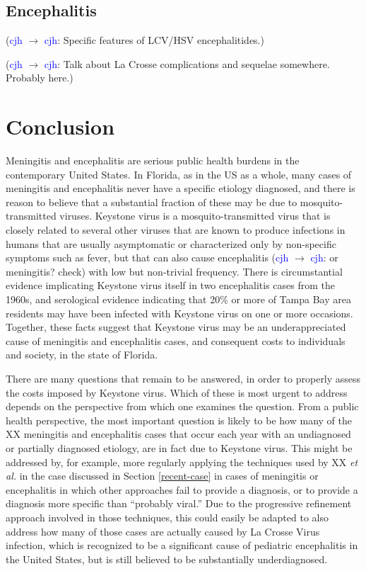 \documentclass[12pt]{article}
\newcommand{\cjh}{\textcolor{blue}{cjh}}
\newcommand{\msg}[3]{(#1 $\rightarrow$ #2: #3)}
\newcommand{\mcc}[1]{\msg\cjh\cjh{#1}}
\begin{document}
        \subsection{Encephalitis}
            \label{cost-encephalitis}
            \mcc{Specific features of LCV/HSV encephalitides.}

            \mcc{Talk about La Crosse complications and sequelae somewhere. Probably here.}

    \section{Conclusion}
        \label{conclusion}
        Meningitis and encephalitis are serious public health burdens in the contemporary United States. In Florida, as in the US as a whole, many cases of meningitis and encephalitis never have a specific etiology diagnosed, and there is reason to believe that a substantial fraction of these may be due to mosquito-transmitted viruses. Keystone virus is a mosquito-transmitted virus that is closely related to several other viruses that are known to produce infections in humans that are usually asymptomatic or characterized only by non-specific symptoms such as fever, but that can also cause encephalitis \mcc{or meningitis? check} with low but non-trivial frequency. There is circumstantial evidence implicating Keystone virus itself in two encephalitis cases from the 1960s, and serological evidence indicating that 20\% or more of Tampa Bay area residents may have been infected with Keystone virus on one or more occasions. Together, these facts suggest that Keystone virus may be an underappreciated cause of meningitis and encephalitis cases, and consequent costs to individuals and society, in the state of Florida.

        There are many questions that remain to be answered, in order to properly assess the costs imposed by Keystone virus. Which of these is most urgent to address depends on the perspective from which one examines the question. From a public health perspective, the most important question is likely to be how many of the XX meningitis and encephalitis cases that occur each year with an undiagnosed or partially diagnosed etiology, are in fact due to Keystone virus. This might be addressed by, for example, more regularly applying the techniques used by XX \textit{et al.}\cite{asdf} in the case discussed in Section \ref{recent-case} in cases of meningitis or encephalitis in which other approaches fail to provide a diagnosis, or to provide a diagnosis more specific than ``probably viral.'' Due to the progressive refinement approach involved in those techniques, this could easily be adapted to also address how many of those cases are actually caused by La Crosse Virus infection, which is recognized to be a significant cause of pediatric encephalitis in the United States, but is still believed to be substantially underdiagnosed.
\end{document}
